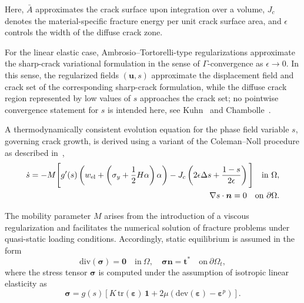 \documentclass[pdflatex,sn-mathphys-num]{sn-jnl}%
\theoremstyle{thmstyleone}%
\theoremstyle{thmstyletwo}%
\theoremstyle{thmstylethree}%
\begin{document}
Here, $\bar{A}$ approximates the crack surface upon integration over a volume, $J_c$ denotes the material-specific fracture energy per unit crack surface area, and $\epsilon$ controls the width of the diffuse crack zone.


For the linear elastic case, Ambrosio--Tortorelli-type regularizations approximate the sharp-crack variational formulation in the sense of $\Gamma$-convergence as $\epsilon \to 0$. In this sense, the regularized fields $(\boldsymbol{u},s)$ approximate the displacement field and crack set of the corresponding sharp-crack formulation, while the diffuse crack region represented by low values of $s$ approaches the crack set; no pointwise convergence statement for $s$ is intended here, see Kuhn~\cite{kuhn_numerical_2013} and Chambolle~\cite{chambolle_approximation_2004}.

A thermodynamically consistent evolution equation for the phase field variable $s$, governing crack growth, is derived using a variant of the Coleman--Noll procedure as described in~\cite{noll_3d_2020},
\begin{align}
    \begin{split}
    \dot{s} = -M \Bigg[
    g'(s)\left(w_{\rm{el}} + \left(\sigma_y+\dfrac{1}{2}H\alpha\right)\alpha\right)
    - J_c\left(2\epsilon\Delta{s} + \dfrac{1-s}{2\epsilon}\right)
    \Bigg]
    \quad \text{in} \ \Omega, \\
    \nabla{s}\cdot{\boldsymbol{n}} = 0 \quad \text{on} \ \partial\Omega.
    \label{eq:evolution_s}
    \end{split}
\end{align}

The mobility parameter $M$ arises from the introduction of a viscous regularization and facilitates the numerical solution of fracture problems under quasi-static loading conditions. 
Accordingly, static equilibrium is assumed in the form
\begin{equation}
    \text{div}(\boldsymbol{\sigma}) = \boldsymbol{0} \quad \text{in} \ \Omega, 
    \quad 
    \boldsymbol{\sigma}\boldsymbol{n} = \boldsymbol{t}^* 
    \quad \text{on} \ \partial\Omega_t,
    \label{eq:equilibrium}
\end{equation}
where the stress tensor $\boldsymbol{\sigma}$ is computed under the assumption of isotropic linear elasticity as
\begin{equation}
    \boldsymbol{\sigma} = g(s)\left[
    K\,\text{tr}(\boldsymbol{\varepsilon})\,\boldsymbol{1}
    + 2\mu\left(\text{dev}(\boldsymbol{\varepsilon}) - \boldsymbol{\varepsilon}^p\right)
    \right].
    \label{eq:sigma_plast}
\end{equation}
\end{document}
